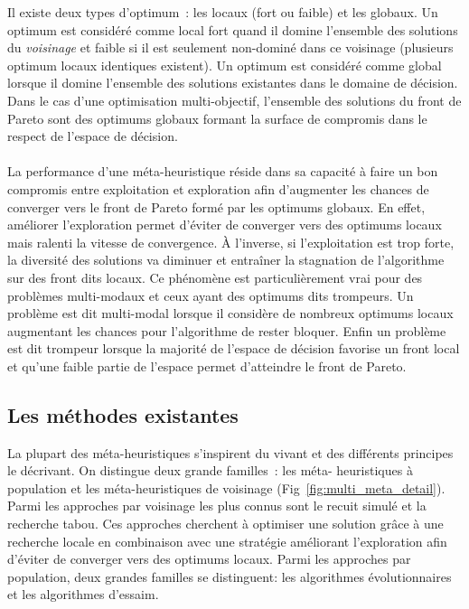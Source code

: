 \begin{Def}\label{def:optimum}
Il existe deux types d’optimum~: les locaux (fort ou faible) et les globaux. Un
optimum est considéré comme local fort quand il domine l’ensemble des solutions du
\emph{voisinage} et faible si il est seulement non-dominé dans ce voisinage (plusieurs
optimum locaux identiques existent). Un optimum est considéré comme global
lorsque il domine l’ensemble des solutions existantes dans le domaine de
décision. Dans le cas d’une optimisation multi-objectif, l’ensemble des
solutions du front de Pareto sont des optimums globaux formant la surface de
compromis dans le respect de l’espace de décision.
\end{Def}

\paragraph{} %
La performance d’une méta-heuristique réside dans sa capacité à faire un bon
compromis entre exploitation et exploration afin d’augmenter les chances de
converger vers le front de Pareto formé par les optimums globaux. En effet,
améliorer l’exploration permet d’éviter de converger vers des optimums locaux
mais ralenti la vitesse de convergence. À l’inverse, si l’exploitation est trop
forte, la diversité des solutions va diminuer et entraîner la stagnation de
l’algorithme sur des front dits locaux. Ce phénomène est particulièrement vrai
pour des problèmes multi-modaux et ceux ayant des optimums dits trompeurs. Un
problème est dit multi-modal lorsque il considère de nombreux optimums locaux
augmentant les chances pour l’algorithme de rester bloquer. Enfin un problème
est dit trompeur lorsque la majorité de l’espace de décision favorise un front
local et qu’une faible partie de l’espace permet d’atteindre le front de Pareto.


\subsection{Les méthodes existantes} %
\label{sub:les_methodes_existantes}
La plupart des méta-heuristiques s’inspirent du vivant et des différents
principes le décrivant. On distingue deux grande familles~: les méta-
heuristiques à population et les méta-heuristiques de voisinage
(Fig~\ref{fig:multi_meta_detail}). Parmi les approches par voisinage les plus
connus sont le recuit simulé et la recherche tabou. Ces approches cherchent à
optimiser une solution grâce à une recherche locale en combinaison avec une stratégie
améliorant l’exploration afin d’éviter de converger vers des optimums locaux.
Parmi les approches par population, deux grandes familles se distinguent: les
algorithmes évolutionnaires et les algorithmes d’essaim.

